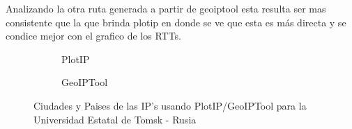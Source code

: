 Analizando la otra ruta generada a partir de geoiptool esta resulta ser
mas consistente que la que brinda plotip en donde se ve que esta es más directa
y se condice mejor con el grafico de los RTTs.

\begin{figure}[ht]
	\begin{subfigure}[b]{0.5\textwidth}
		\centering
		
		\caption{PlotIP}
	\end{subfigure}
	\begin{subfigure}[b]{0.5\textwidth}
		\centering
		
		\caption{GeoIPTool}
	\end{subfigure}
	\caption{Ciudades y Paises de las IP's usando PlotIP/GeoIPTool para la Universidad Estatal de Tomsk - Rusia}
	\label{fig:lugares_tsu}
\end{figure}


